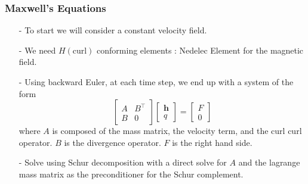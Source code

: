 \documentclass[mathserif]{beamer} %
\begin{document}
\begin{frame}
    \frametitle{Maxwell's Equations}
    \begin{itemize}
        \item[-] To start we will consider a constant velocity field.
        \pause
        \item[-] We need $H(\text{curl})$ conforming elements : Nedelec Element for the magnetic field.
        \pause
        \item[-] Using backward Euler, at each time step, we end up with a system of the form
            \[ \begin{bmatrix} A & B^\top \\ B & 0 \end{bmatrix} \begin{bmatrix} \boldsymbol{h} \\ q \end{bmatrix} = \begin{bmatrix} F \\ 0 \end{bmatrix}
                \]
                where $A$ is composed of the mass matrix, the velocity term, and the curl curl operator. $B$ is the divergence operator. $F$ is the right hand side. 
        \pause
            \item[-] Solve using Schur decomposition with a direct solve for $A$ and the lagrange mass matrix as the preconditioner for the Schur complement.%
    \end{itemize}
\end{frame}
\end{document}
